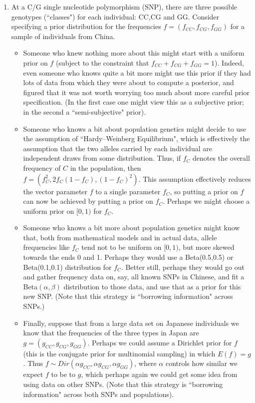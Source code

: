 \documentclass[12pt]{article}
\begin{document}
\begin{enumerate}
  \item At a C/G single nucleotide polymorphism (SNP), there are three possible genotypes (``classes") for each individual: CC,CG and GG. 
 Consider specifying a prior distribution for the  frequencies $f=(f_{CC},f_{CG},f_{GG})$ for a sample of individuals from China.
 \begin{itemize}
 \item Someone who knew nothing more about this might start with a uniform prior on $f$ (subject to the constraint that $f_{CC}+f_{CG}+f_{GG}=1$). Indeed, even someone who knows quite a bit more might use this prior if they had lots of data from which they were about to compute a posterior, and figured that it was not worth worrying too much about more careful prior specification. (In the first case one might view this as a subjective prior; in the second a ``semi-subjective" prior).
 \item Someone who knows a bit about population genetics might decide to use the assumption of ``Hardy--Weinberg Equilibrium", which is effectively the assumption that the two alleles carried by each individual are independent draws from some distribution. Thus, if $f_C$ denotes the overall frequency of $C$ in the population, then $f=(f_C^2, 2f_C(1-f_C),(1-f_C)^2)$. This assumption effectively reduces the vector parameter $f$ to a single parameter $f_C$, so
 putting a prior on $f$ can now be achieved by putting
 a prior on $f_C$. Perhaps we might choose a uniform prior on $[0,1)$ for $f_C$.
 \item Someone who knows a bit more about population genetics might know that, both from mathematical models and in actual data, allele frequencies like $f_C$ tend not to be uniform on $[0,1)$, but more skewed towards the ends 0 and 1. Perhaps they would use a Beta(0.5,0.5) or Beta(0.1,0.1) distribution for $f_C$. Better still, perhaps they would go out and gather frequency data on, say, all known SNPs in Chinese, and fit a Beta$(\alpha, \beta)$ distribution to those data,
 and use that as a prior for this new SNP. (Note that this strategy is ``borrowing information" across SNPs.)
 \item  Finally, suppose that from a large data set on Japanese individuals we know that the frequencies of the three types in Japan are $g=(g_{CC},g_{CG},g_{GG})$. Perhaps we could
 assume a Dirichlet prior for $f$ (this is the
 conjugate prior for multinomial sampling) in which $E(f)=g$. Thus $f \sim Dir(\alpha g_{CC},\alpha g_{CG}, \alpha g_{GG})$, where $\alpha$ controls how similar we expect $f$ to be to $g$, which 
 perhaps again we could get some idea from using data on other SNPs. (Note that this strategy
 is ``borrowing information" across both SNPs and populations).
   \end{itemize}
   

\end{enumerate}
\end{document}
